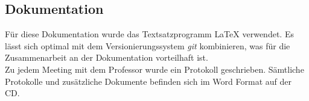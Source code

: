 \subsection{Dokumentation}
Für diese Dokumentation wurde das Textsatzprogramm {\LaTeX} verwendet. Es lässt sich optimal mit dem Versionierungssystem \textit{\gls{git}} kombinieren, was für die Zusammenarbeit an der Dokumentation vorteilhaft ist.
\\

Zu jedem Meeting mit dem Professor wurde ein Protokoll geschrieben. Sämtliche Protokolle und zusätzliche Dokumente befinden sich im Word Format auf der CD.
